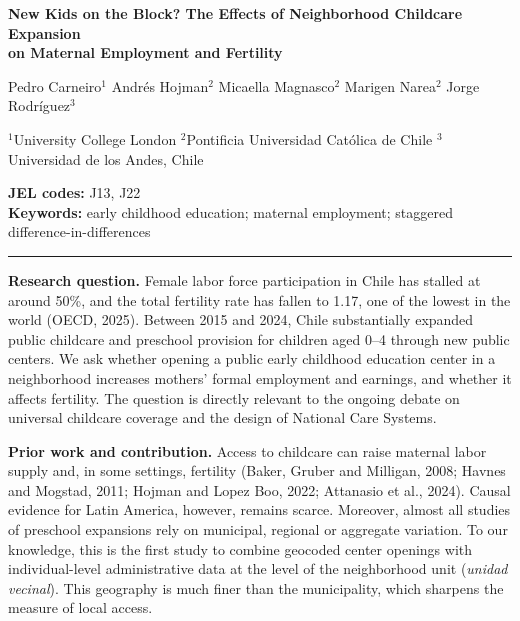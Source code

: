 \documentclass[11pt]{article}
\begin{document}
\begin{center}
{\large\bfseries New Kids on the Block? The Effects of Neighborhood Childcare Expansion\\[2pt] on Maternal Employment and Fertility}

\vspace{8pt}
Pedro Carneiro$^{1}$ \quad Andr\'es Hojman$^{2}$ \quad Micaella Magnasco$^{2}$ \quad Marigen Narea$^{2}$ \quad Jorge Rodr\'iguez$^{3}$

\vspace{3pt}
{\small $^{1}$University College London \quad $^{2}$Pontificia Universidad Cat\'olica de Chile \quad $^{3}$Universidad de los Andes, Chile}
\end{center}

\vspace{2pt}
\noindent\textbf{JEL codes:} J13, J22\\
\textbf{Keywords:} early childhood education; maternal employment; staggered difference-in-differences

\vspace{2pt}
\hrule
\vspace{4pt}

\textbf{Research question.} Female labor force participation in Chile has stalled at around 50\%, and the total fertility rate has fallen to 1.17, one of the lowest in the world (OECD, 2025). Between 2015 and 2024, Chile substantially expanded public childcare and preschool provision for children aged 0--4 through new public centers. We ask whether opening a public early childhood education center in a neighborhood increases mothers' formal employment and earnings, and whether it affects fertility. The question is directly relevant to the ongoing debate on universal childcare coverage and the design of National Care Systems.

\textbf{Prior work and contribution.} Access to childcare can raise maternal labor supply and, in some settings, fertility (Baker, Gruber and Milligan, 2008; Havnes and Mogstad, 2011; Hojman and Lopez Boo, 2022; Attanasio et al., 2024). Causal evidence for Latin America, however, remains scarce. Moreover, almost all studies of preschool expansions rely on municipal, regional or aggregate variation. To our knowledge, this is the first study to combine geocoded center openings with individual-level administrative data at the level of the neighborhood unit (\emph{unidad vecinal}). This geography is much finer than the municipality, which sharpens the measure of local access.
\end{document}
